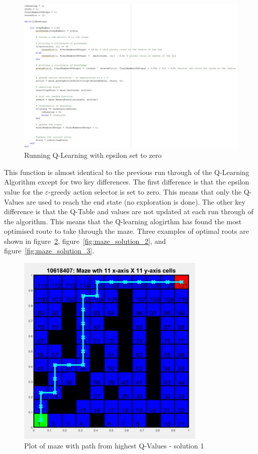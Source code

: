 \documentclass [11pt]{article}
\begin{document}
\begin{figure}[H]
\centerline{\includegraphics[width=15cm]{q-learning_with_exploration_set_to_zero}}
\caption{Running Q-Learning with epsilon set to zero}
\label{fig:q_learning_with_e_set_to_zero}
\end{figure}

This function is almost identical to the previous run through of the Q-Learning Algorithm except for two key differences. The first difference is that the epsilon value for the $\varepsilon$-greedy action selector is set to zero. This means that only the Q-Values are used to reach the end state (no exploration is done). The other key difference is that the Q-Table and values are not updated at each run through of the algorithm. This means that the Q-learning alogirthm has found the most optimised route to take through the maze. Three examples of optimal roots are shown in figure~\ref{fig:maze_solution_1}, figure~\ref{fig:maze_solution_2}, and figure~\ref{fig:maze_solution_3}.

\begin{figure}[H]
\centerline{\includegraphics[width=9cm]{maze_solution_1}}
\caption{Plot of maze with path from highest Q-Values - solution 1}
\label{fig:maze_solution_1}
\end{figure}
\end{document}
